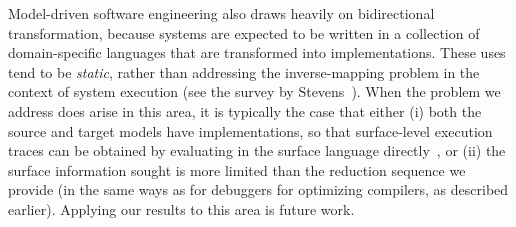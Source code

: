 Model-driven software engineering also draws heavily on
bidirectional transformation, because systems are expected to be written
in a collection of domain-specific languages that are transformed into
implementations. These uses tend to be \emph{static}, rather
than addressing the inverse-mapping problem in the context of system
execution (see the survey by
Stevens~\cite{bidirectional-model-transfs}).
When the problem we address does arise in this area, it is typically the
case that either (i) both the source and target models have
implementations, so that surface-level execution traces can be obtained
by evaluating in the surface language directly~\cite{Perera-slicing}, or
(ii) the surface information sought is more limited than the reduction
sequence we provide (in the same ways as for debuggers for optimizing
compilers, as described earlier).
Applying our results to this area is future work.
